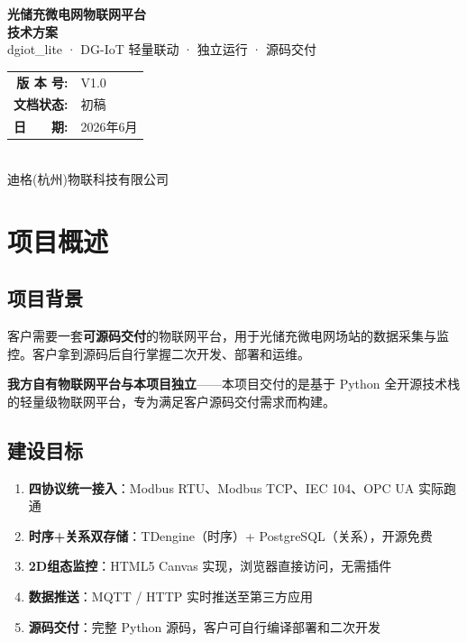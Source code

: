 \documentclass[12pt,a4paper]{ctexart}
\begin{document}
\begin{titlepage}
\centering\vspace*{3.5cm}
{\Huge\bfseries\sffamily 光储充微电网物联网平台}\\[0.8cm]
{\LARGE\bfseries 技术方案}\\[1.5cm]
{\large dgiot\_lite · DG-IoT 轻量联动 · 独立运行 · 源码交付}\\[2.5cm]
{\large\begin{tabular}{rl}
\textbf{版 本 号:} & V1.0 \\
\textbf{文档状态:} & 初稿 \\
\textbf{日　　期:} & 2026年6月 \\
\end{tabular}}\\[1.5cm]
{\normalsize 迪格(杭州)物联科技有限公司}
\end{titlepage}

\newpage\tableofcontents\newpage

\section{项目概述}

\subsection{项目背景}
客户需要一套\textbf{可源码交付}的物联网平台，用于光储充微电网场站的数据采集与监控。客户拿到源码后自行掌握二次开发、部署和运维。

\textbf{我方自有物联网平台与本项目独立}——本项目交付的是基于 Python 全开源技术栈的轻量级物联网平台，专为满足客户源码交付需求而构建。

\subsection{建设目标}
\begin{enumerate}[leftmargin=*]
  \item \textbf{四协议统一接入}：Modbus RTU、Modbus TCP、IEC 104、OPC UA 实际跑通
  \item \textbf{时序+关系双存储}：TDengine（时序）+ PostgreSQL（关系），开源免费
  \item \textbf{2D组态监控}：HTML5 Canvas 实现，浏览器直接访问，无需插件
  \item \textbf{数据推送}：MQTT / HTTP 实时推送至第三方应用
  \item \textbf{源码交付}：完整 Python 源码，客户可自行编译部署和二次开发
\end{enumerate}
\end{document}
